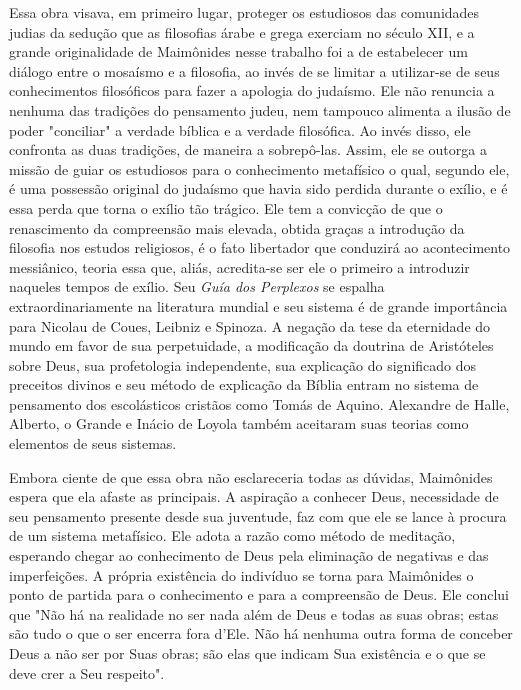 \begin{itemize}
\begin{enumrate}
Essa obra visava, em primeiro lugar, proteger os estudiosos das
co­munidades judias da sedução que as filosofias árabe e grega exerciam
no século XII, e a grande originalidade de Maimônides nesse trabalho foi
a de estabelecer um diálogo entre o mosaísmo e a filosofia, ao invés de
se limitar a utilizar-se de seus conhecimentos filosóficos para fazer a
apologia do judaísmo. Ele não renuncia a nenhuma das tradições do
pensamento judeu, nem tampouco ali­menta a ilusão de poder "conciliar" a
verdade bíblica e a verdade filosófica. Ao invés disso, ele confronta as
duas tradições, de maneira a sobrepô-las. As­sim, ele se outorga a
missão de guiar os estudiosos para o conhecimento meta­físico o qual,
segundo ele, é uma possessão original do judaísmo que havia sido perdida
durante o exílio, e é essa perda que torna o exílio tão trágico. Ele tem
a convicção de que o renascimento da compreensão mais elevada, obtida
gra­ças a introdução da filosofia nos estudos religiosos, é o fato
libertador que con­duzirá ao acontecimento messiânico, teoria essa que,
aliás, acredita-se ser ele o primeiro a introduzir naqueles tempos de
exílio.
Seu \emph{Guía dos Perplexos} se espalha extraordinariamente na
literatura mundial e seu sistema é de grande importância para Nicolau de
Coues, Leibniz e Spinoza. A negação da tese da eternidade do mundo em
favor de sua perpe­tuidade, a modificação da doutrina de Aristóteles
sobre Deus, sua profetologia independente, sua explicação do significado
dos preceitos divinos e seu méto­do de explicação da Bíblia entram no
sistema de pensamento dos escolásticos cristãos como Tomás de Aquino.
Alexandre de Halle, Alberto, o Grande e Iná­cio de Loyola também
aceitaram suas teorias como elementos de seus sistemas.

Embora ciente de que essa obra não esclareceria todas as dúvidas,
Maimônides espera que ela afaste as principais. A aspiração a conhecer
Deus, necessidade de seu pensamento presente desde sua juventude, faz
com que ele se lance à procura de um sistema metafísico. Ele adota a
razão como método de meditação, esperando chegar ao conhecimento de Deus
pela eliminação de negativas e das imperfeições. A própria existência do
indivíduo se torna para Maimônides o ponto de partida para o
conhecimento e para a compreensão de Deus. Ele conclui que "Não há na
realidade no ser nada além de Deus e to­das as suas obras; estas são
tudo o que o ser encerra fora d'Ele. Não há nenhu­ma outra forma de
conceber Deus a não ser por Suas obras; são elas que indi­cam Sua
existência e o que se deve crer a Seu respeito".


\end{enumrate}
\end{itemize}

